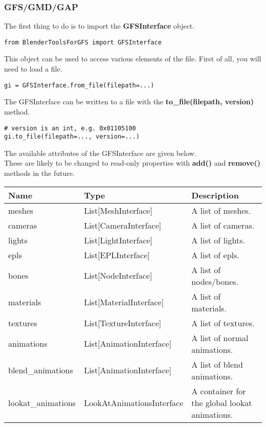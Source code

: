 \documentclass{article}
\begin{document}
\subsubsection{GFS/GMD/GAP}
The first thing to do is to import the \textbf{GFSInterface} object.
\begin{lstlisting}[style=pythonstyling]
from BlenderToolsForGFS import GFSInterface
\end{lstlisting}
This object can be used to access various elements of the file. First of all, you will need to load a file.
\begin{lstlisting}[style=pythonstyling]
gi = GFSInterface.from_file(filepath=...) 
\end{lstlisting}
The GFSInterface can be written to a file with the \textbf{to\_file(filepath, version)} method.
\begin{lstlisting}[style=pythonstyling]
# version is an int, e.g. 0x01105100
gi.to_file(filepath=..., version=...)
\end{lstlisting}

The available attributes of the GFSInterface are given below.\\
These are likely to be changed to read-only properties with \textbf{add()} and \textbf{remove()} methods in the future.
\begin{center}
\begin{longtable}{p{}p{}p{}}
\hline
Name & Type & Description\\
\hline
meshes & List[MeshInterface] & A list of meshes.\\
cameras & List[CameraInterface] & A list of cameras.\\
lights & List[LightInterface] & A list of lights.\\
epls & List[EPLInterface] & A list of epls.\\
bones & List[NodeInterface] & A list of nodes/bones.\\
materials & List[MaterialInterface] & A list of materials.\\
textures & List[TextureInterface] & A list of textures.\\
animations & List[AnimationInterface] & A list of normal animations.\\
blend\_animations & List[AnimationInterface] & A list of blend animations.\\
lookat\_animations & LookAtAnimationsInterface & A container for the global lookat animations.\\
\hline
\end{longtable}
\end{center}
\end{document}
